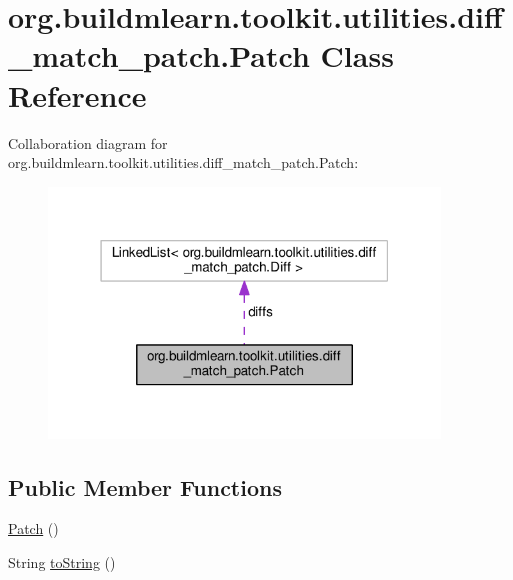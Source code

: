 \hypertarget{classorg_1_1buildmlearn_1_1toolkit_1_1utilities_1_1diff__match__patch_1_1Patch}{}\section{org.\+buildmlearn.\+toolkit.\+utilities.\+diff\+\_\+match\+\_\+patch.\+Patch Class Reference}
\label{classorg_1_1buildmlearn_1_1toolkit_1_1utilities_1_1diff__match__patch_1_1Patch}


Collaboration diagram for org.\+buildmlearn.\+toolkit.\+utilities.\+diff\+\_\+match\+\_\+patch.\+Patch\+:
\nopagebreak
\begin{figure}[H]
\begin{center}
\leavevmode
\includegraphics[width=295pt]{classorg_1_1buildmlearn_1_1toolkit_1_1utilities_1_1diff__match__patch_1_1Patch__coll__graph}
\end{center}
\end{figure}
\subsection*{Public Member Functions}
\begin{DoxyCompactItemize}
\item 
\hyperlink{classorg_1_1buildmlearn_1_1toolkit_1_1utilities_1_1diff__match__patch_1_1Patch_ac19c8832e4505e8ce7ba97865c811407}{Patch} ()
\item 
String \hyperlink{classorg_1_1buildmlearn_1_1toolkit_1_1utilities_1_1diff__match__patch_1_1Patch_aaf19c2f44229af948fa606046bd383e8}{to\+String} ()
\end{DoxyCompactItemize}
